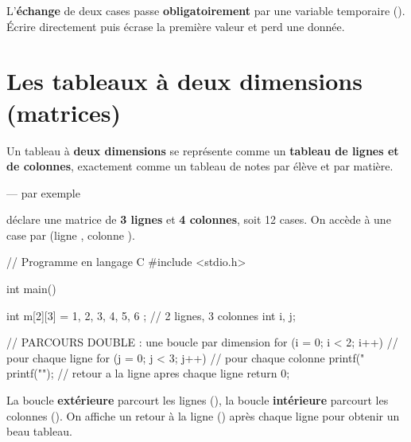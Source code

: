 
\begin{attention}
L'\textbf{échange} de deux cases passe \textbf{obligatoirement} par une variable
temporaire (). Écrire directement  puis
 écrase la première valeur et perd une donnée.
\end{attention}

\section{Les tableaux à deux dimensions (matrices)}

Un tableau à \textbf{deux dimensions} se représente comme un \textbf{tableau de
lignes et de colonnes}, exactement comme un tableau de notes par élève et par
matière.

\begin{syntaxe}
\quad — par exemple 
\end{syntaxe}

 déclare une matrice de \textbf{3 lignes} et \textbf{4 colonnes},
soit 12 cases. On accède à une case par  (ligne , colonne
).

\begin{codec}
// Programme en langage C
#include <stdio.h>

int main() {
    int m[2][3] = { {1, 2, 3},
                    {4, 5, 6} };   // 2 lignes, 3 colonnes
    int i, j;

    // PARCOURS DOUBLE : une boucle par dimension
    for (i = 0; i < 2; i++) {           // pour chaque ligne
        for (j = 0; j < 3; j++) {       // pour chaque colonne
            printf("%
        }
        printf("\n");       // retour a la ligne apres chaque ligne
    }
    return 0;
}
\end{codec}


\begin{remarque}
La boucle \textbf{extérieure} parcourt les lignes (), la boucle
\textbf{intérieure} parcourt les colonnes (). On affiche un retour à la
ligne (\code{\\n}) après chaque ligne pour obtenir un beau tableau.
\end{remarque}

